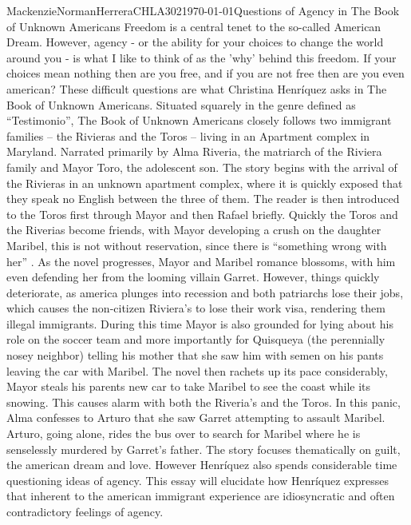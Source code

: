 \documentclass{article}
\begin{document}
\begin{mla}{Mackenzie}{Norman}{Herrera}{CHLA302}{\today}{Questions of Agency in The Book of Unknown Americans}
Freedom is a central tenet to the so-called American Dream. However, agency - or the ability for your choices to change the world around you - is what I like to think of as the 'why' behind this freedom. If your choices mean nothing then are you free, and if you are not free then are you even american? These difficult questions are what Christina Henríquez asks in The Book of Unknown Americans. Situated squarely in the genre defined as ``Testimonio''\cite{testimonio}, The Book of Unknown Americans closely follows two immigrant families -- the Rivieras and the Toros -- living in an Apartment complex in Maryland. Narrated primarily by Alma Riveria, the matriarch of the Riviera family and Mayor Toro, the adolescent son. The story begins with the arrival of the Rivieras in an unknown apartment complex, where it is quickly exposed that they speak no English between the three of them. The reader is then introduced to the Toros first through Mayor and then Rafael briefly. Quickly the Toros and the Riverias become friends, with Mayor developing a crush on the daughter Maribel, this is not without reservation, since there is ``something wrong with her'' . As the novel progresses, Mayor and Maribel romance blossoms, with him even defending her from the looming villain Garret. However, things quickly deteriorate, as america plunges into recession and both patriarchs lose their jobs, which causes the non-citizen Riviera's to lose their work visa, rendering them illegal immigrants. During this time Mayor is also grounded for lying about his role on the soccer team and more importantly for Quisqueya (the perennially nosey neighbor) telling his mother that she saw him with semen on his pants leaving the car with Maribel. The novel then rachets up its pace considerably, Mayor steals his parents new car to take Maribel to see the coast while its snowing. This causes alarm with both the Riveria's and the Toros. In this panic, Alma confesses to Arturo that she saw Garret attempting to assault Maribel. Arturo, going alone, rides the bus over to search for Maribel where he is senselessly murdered by Garret's father. The story focuses thematically on guilt, the american dream and love. However Henríquez also spends considerable time questioning ideas of agency. This essay will elucidate how Henríquez expresses that inherent to the american immigrant experience are idiosyncratic and often contradictory feelings of agency.


\end{mla}
\end{document}
